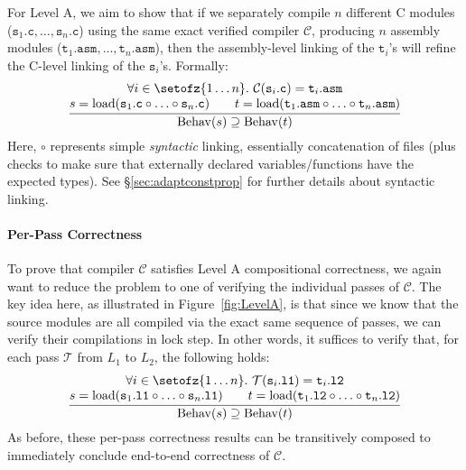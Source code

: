 For Level A, we aim to show that if we separately compile $n$
different C modules
($\mathtt{s}_1\mathtt{.c},\ldots,\mathtt{s}_n\mathtt{.c}$) using the
same exact verified compiler $\mathcal{C}$, producing $n$ assembly
modules
($\mathtt{t}_1\mathtt{.asm},\ldots,\mathtt{t}_n\mathtt{.asm}$), then
the assembly-level linking of the $\mathtt{t}_i$'s will refine the
C-level linking of the $\mathtt{s}_i$'s.  Formally:
\[
\frac{
\begin{array}{@{}c@{}}
\forall i\in\setofz{1\ldots n}.~\mathcal{C}(\mathtt{s}_i\mathtt{.c}) = \mathtt{t}_i\mathtt{.asm} \\
s = \mathrm{load}(\mathtt{s}_1\mathtt{.c}\circ \ldots \circ \mathtt{s}_n\mathtt{.c})\qquad
t = \mathrm{load}(\mathtt{t}_1\mathtt{.asm}\circ \ldots \circ \mathtt{t}_n\mathtt{.asm})
\end{array}
}
{\mathrm{Behav}(s) \supseteq \mathrm{Behav}(t)}
\]
Here, $\circ$ represents simple \emph{syntactic} linking, \ie
essentially concatenation of files (plus checks to make sure that
externally declared variables/functions have the expected types).  See
\S\ref{sec:adaptconstprop} for further details about syntactic
linking.

\newcommand{\mys}[1]{\mathtt{s}_{#1}}
\newcommand{\myt}[1]{\mathtt{t}_{#1}}

\paragraph{Per-Pass Correctness}

To prove that compiler $\mathcal{C}$ satisfies Level A compositional
correctness, we again want to reduce the problem to one of verifying
the individual passes of $\mathcal{C}$.  The key idea here, as
illustrated in Figure~\ref{fig:LevelA}, is that since we know that the
source modules are all compiled via the exact same sequence of passes,
we can verify their compilations in lock step.  In other words, it
suffices to verify that, for each pass $\mathcal{T}$ from $L_1$ to
$L_2$, the following holds:
\[
\frac{
\begin{array}{@{}c@{}}
\forall i\in\setofz{1\ldots n}.~\mathcal{T}(\mathtt{s}_i\mathtt{.l1}) = \mathtt{t}_i\mathtt{.l2} \\
s = \mathrm{load}(\mathtt{s}_1\mathtt{.l1}\circ \ldots \circ \mathtt{s}_n\mathtt{.l1})\qquad
t = \mathrm{load}(\mathtt{t}_1\mathtt{.l2}\circ \ldots \circ \mathtt{t}_n\mathtt{.l2})
\end{array}
}
{
\mathrm{Behav}(s) 
\supseteq \mathrm{Behav}(t)
}
\]
As before, these per-pass correctness results can be transitively
composed to immediately conclude end-to-end correctness of
$\mathcal{C}$.

